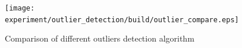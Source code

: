 \documentclass{article}
\begin{document}
\begin{figure}[!ht]
	\centering
	{\texttt{[image: experiment/outlier\_detection/build/outlier\_compare.eps]}}
	{} %
	\caption{Comparison of different outliers detection algorithm}\label{fig:outlier}
\end{figure}


\end{document}
